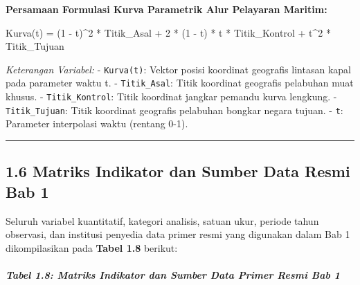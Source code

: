 \documentclass[
]{article}
\newenvironment{Shaded}{}{}
\newcommand{\NormalTok}[1]{#1}
\begin{document}
\textbf{Persamaan Formulasi Kurva Parametrik Alur Pelayaran Maritim:}

\begin{Shaded}
\begin{Highlighting}[]
\NormalTok{Kurva(t) = (1 {-} t)\^{}2 * Titik\_Asal + 2 * (1 {-} t) * t * Titik\_Kontrol + t\^{}2 * Titik\_Tujuan}
\end{Highlighting}
\end{Shaded}

\emph{Keterangan Variabel:} - \texttt{Kurva(t)}: Vektor posisi koordinat
geografis lintasan kapal pada parameter waktu t. - \texttt{Titik\_Asal}:
Titik koordinat geografis pelabuhan muat khusus. -
\texttt{Titik\_Kontrol}: Titik koordinat jangkar pemandu kurva lengkung.
- \texttt{Titik\_Tujuan}: Titik koordinat geografis pelabuhan bongkar
negara tujuan. - \texttt{t}: Parameter interpolasi waktu (rentang 0-1).

\begin{center}\rule{0.5\linewidth}{0.5pt}\end{center}

\subsection{1.6 Matriks Indikator dan Sumber Data Resmi Bab
1}\label{matriks-indikator-dan-sumber-data-resmi-bab-1}

Seluruh variabel kuantitatif, kategori analisis, satuan ukur, periode
tahun observasi, dan institusi penyedia data primer resmi yang digunakan
dalam Bab 1 dikompilasikan pada \textbf{Tabel 1.8} berikut:

\subparagraph{Tabel 1.8: Matriks Indikator dan Sumber Data Primer Resmi
Bab
1}\label{tabel-1.8-matriks-indikator-dan-sumber-data-primer-resmi-bab-1}
\end{document}
